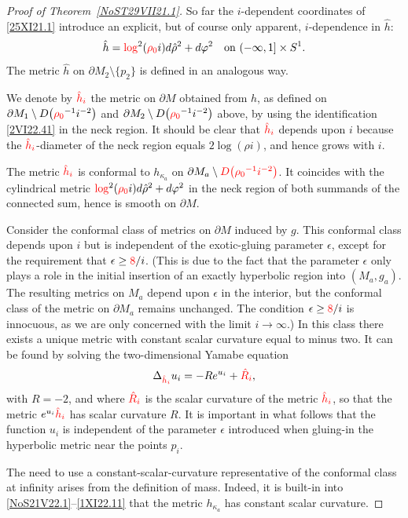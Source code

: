 \documentclass[10pt,a4paper]{article}
\numberwithin{equation}{section}
\newcommand{\hhi}{{\red{\hat h_{i}}}}
\newcommand{\hrho}{\hat\rho}
\newcommand{\hRi}{{\red{\hat R_{i}}}}
\newcommand{\red}[1]{{\color{red}#1}}
\newcommand{\rhozero}{\red{\rho_0}}
\begin{document}
\begin{proof}[Proof of Theorem~\ref{NoST29VII21.1}]
So far the $i$-dependent coordinates of \eqref{25XI21.1} introduce an explicit, but of course only apparent, $i$-dependence in $\hat h$:
\[
\hat h = \red{\log}^2( \rhozero i) {\rm d}\hrho^2 + {\rm d}\varphi^2 \quad \text{on} \ (-\infty,1]\times S^1.
\]
The metric $\hat h $ on $\partial M_2\setminus \{p_2\}$ is defined in an analogous way.

We denote by $\hhi $ the metric on $\partial M$ obtained from $\hat h$, as defined on
$\partial M_1 \setminus D\big(\rhozero^{-1}i^{-2}\big) $ and $\partial M_2\setminus D\big(\rhozero^{-1}i^{-2}\big) $ above, by using the identification \eqref{2VI22.41} in the neck region. It should be clear that $\hhi$ depends upon $i$ because the $\hhi$-diameter of the neck region equals $2 \log(\rho i)$, and hence grows with $i$.

The metric $\hhi$ is
conformal to $h_{\kappa_a}$ on $\partial M_a\setminus \red{D\big(\rhozero^{-1}i^{-2}\big)}$. It coincides with the cylindrical metric $ \red{\log}^2(\rhozero i) {\rm d}\hrho^2 + {\rm d}\varphi^2 $ in the neck region of both summands of the connected sum, hence is smooth on $\partial M$.

Consider the conformal class of metrics on $\partial M$ induced by $g$.
This conformal class depends upon $i$ but is independent of the exotic-gluing parameter $\epsilon$, except for the requirement that $\epsilon \ge \red{8}/i$.
(This is due to the fact that the parameter $\epsilon$ only plays a role in the initial insertion of an exactly hyperbolic region into $(M_a,g_a)$. The resulting metrics on $M_a$ depend upon $\epsilon$ in the interior, but the conformal class of the metric on $\partial M_a$ remains unchanged.
The condition $\epsilon \ge \red{8}/i$ is innocuous, as we are only concerned with the limit $i\to\infty$.)
In this class there exists a unique metric with constant scalar curvature equal to minus two.
It can be found by solving the two-dimensional Yamabe equation
\begin{equation}\label{NoS31VII21.31}
 \Delta_{\hhi }u_i = - R {\rm e}^{ u_i} + \hRi,
\end{equation}
with $R=-2$, and where $\hRi $ is the scalar curvature of the metric $\hhi $, so that the metric ${\rm e}^{ u_i}\hhi $ has scalar curvature $R$.
It is important in what follows that the function $u_i$ is independent of the parameter $\epsilon$ introduced when gluing-in the hyperbolic metric near the points $p_i$.

The need to use a constant-scalar-curvature representative of the conformal class at infinity arises from the definition of mass. Indeed, it is built-in into \eqref{NoS21V22.1}--\eqref{1XI22.11} that the metric $h_{\kappa_a}$ has constant scalar curvature.


\end{proof}
\end{document}
